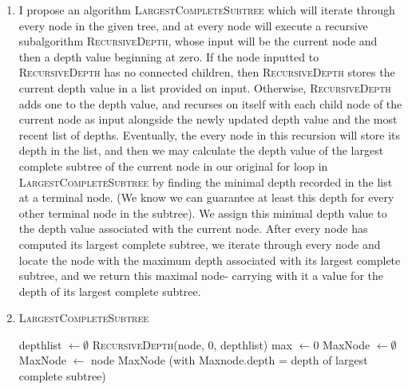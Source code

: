 \documentclass{article}
\begin{document}
\begin{enumerate}
	\item I propose an algorithm \textsc{LargestCompleteSubtree} which will iterate through every node in 
		the given tree, and at every node will execute a recursive subalgorithm \textsc{RecursiveDepth}, 
		whose input will be the current node and then a depth value beginning at zero. If the node
		inputted to \textsc{RecursiveDepth} has no connected children, then \textsc{RecursiveDepth}
		stores the current depth value in a list provided on input. 
		Otherwise, \textsc{RecursiveDepth} adds one to the depth value, 
		and recurses on itself with each child node of the current node as input
		alongside the newly updated depth value and the most recent list of depths. 
		Eventually, the every node in this recursion will store its depth in the list, 
		and then we may calculate the depth value of the largest complete subtree
		of the current node in our original for loop in \textsc{LargestCompleteSubtree} by finding
		the minimal depth recorded in the list at a terminal node. (We know we can guarantee at least this
		depth for every other terminal node in the subtree). We assign this minimal
		depth value to the depth value associated with the current node. After every node has computed its
		largest complete subtree, we iterate through every node and locate the node with the maximum depth
		associated with its largest complete subtree, and we return this maximal node- carrying with it a
		value for the depth of its largest complete subtree.
	\item \begin{algorithm}
			\caption{\textsc{LargestCompleteSubtree}}
			\begin{algorithmic}[1]
				\State depthlist $\gets \emptyset$
					\State \textsc{RecursiveDepth}(node, 0, depthlist)
				\EndFor
				\State max $\gets 0$
				\State MaxNode $\gets \emptyset$
						\State MaxNode $\gets$ node
					\EndIf
				\EndFor
				\State \Return MaxNode (with Maxnode.depth = depth of largest complete subtree)
			\end{algorithmic}		
	\end{algorithm}


\end{enumerate}
\end{document}

